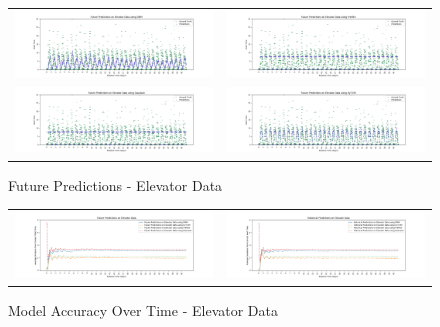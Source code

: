 \begin{figure}
  \begin{tabular}{cc}
    {\includegraphics[width = 3in]{images/results/Future_elevator_DMM.png}} &
    {\includegraphics[width = 3in]{images/results/Future_elevator_FreMEn.png}} \\
    {\includegraphics[width = 3in]{images/results/Future_elevator_Gaussian.png}} &
    {\includegraphics[width = 3in]{images/results/Future_elevator_HyT-EM.png}} \\
  \end{tabular}
  \caption{Future Predictions - Elevator Data}
  \label{figure:Future_Predictions_-_Elevator_Data}
\end{figure}

\begin{figure}
  \begin{tabular}{cc}
    {\includegraphics[width = 3in]{images/results/Future_Predictions_on_Elevator_Data.png}} &
    {\includegraphics[width = 3in]{images/results/Historical_Predictions_on_Elevator_Data.png}} \\
  \end{tabular}
  \caption{Model Accuracy Over Time - Elevator Data}
  \label{figure:Model_Accuracy_Over_Time_-_Elevator_Data}
\end{figure}

